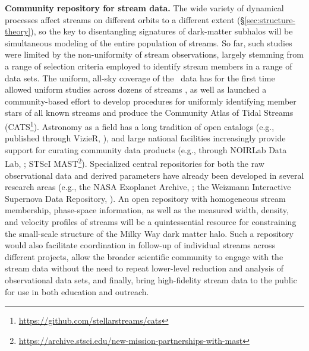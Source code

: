 \documentclass[final,5p,times,twocolumn,authoryear]{elsarticle}
\begin{document}
\textbf{Community repository for stream data.}
The wide variety of dynamical processes affect streams on different orbits to a different extent (\S\ref{sec:structure-theory}), so the key to disentangling signatures of dark-matter subhalos will be simultaneous modeling of the entire population of streams.
So far, such studies were limited by the non-uniformity of stream observations, largely stemming from a range of selection criteria employed to identify stream members in a range of data sets.
The uniform, all-sky coverage of the \gaia\ data has for the first time allowed uniform studies across dozens of streams \citep[e.g.,][]{bonaca:2021,malhan:2022,ibata:2023}, as well as launched a community-based effort to develop procedures for uniformly identifying member stars of all known streams and produce the Community Atlas of Tidal Streams (CATS\footnote{\url{https://github.com/stellarstreams/cats}}).
Astronomy as a field has a long tradition of open catalogs (e.g., published through VizieR, \citealt{ochsenbein:2000}), and large national facilities increasingly provide support for curating community data products (e.g., through NOIRLab Data Lab, \citealt{nikutta:2020}; STScI MAST\footnote{\url{https://archive.stsci.edu/new-mission-partnerships-with-mast}}).
Specialized central repositories for both the raw observational data and derived parameters have already been developed in several research areas (e.g., the NASA Exoplanet Archive, \citealt{akeson:2013}; the Weizmann Interactive Supernova Data Repository, \citealt{yaron:2012}).
An open repository with homogeneous stream membership, phase-space information, as well as the measured width, density, and velocity profiles of streams will be a quintessential resource for constraining the small-scale structure of the Milky Way dark matter halo.
Such a repository would also facilitate coordination in follow-up of individual streams across different projects, allow the broader scientific community to engage with the stream data without the need to repeat lower-level reduction and analysis of observational data sets, and finally, bring high-fidelity stream data to the public for use in both education and outreach.
\end{document}
